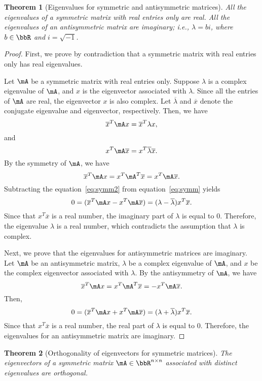 \documentclass[11pt]{article}
\theoremstyle{plain}
\newtheorem{thm}{Theorem}[section]
\theoremstyle{definition}
\begin{document}
\begin{thm}[Eigenvalues for symmetric and antisymmetric matrices]\label{thm:symmeign}
All the eigenvalues of a symmetric matrix with real entries only are real. All the eigenvalues of an antisymmetric matrix are imaginary; i.e., $\lambda = b i$, where $b \in \bbR$ and $ i = \sqrt{-1}$.
\end{thm}
\begin{proof}
	First, we prove by contradiction that a symmetric matrix with real entries only has real eigenvalues. 
	
	Let  $\mA$  be a symmetric  matrix with real entries only. Suppose $\lambda$  is a complex eigenvalue of $\mA$, and $x$ is the eigenvector associated with $\lambda$. Since all the entries of $\mA$ are real, the eigenvector $x$ is also complex. Let $\overline \lambda$ and $\overline x$ denote the conjugate eigenvalue and eigenvector, respectively. Then,  we have
	\begin{equation}\label{eq:symm}
		\overline x^T \mA x = \overline x^T \lambda x,
	\end{equation} 
	and
	\begin{equation}\label{eq:symm2}
		x^T \mA \overline x = x^T \overline \lambda \overline x.
	\end{equation}
	 By the symmetry of $\mA$, we have
	\[ \overline x^T \mA x  = x^T \mA^T \overline x = x^T \mA \overline x .\] 
	 Subtracting the equation~\eqref{eq:symm2} from equation~\eqref{eq:symm} yields	\[  0 = ( \overline x^T \mA x -  x^T \mA \overline x ) = (\lambda - \overline \lambda) x^T \overline x.  \]
	Since that $x^T \overline x$ is a real number, the imaginary part of $\lambda$ is equal to 0. Therefore, the eigenvalue $\lambda$ is a real number, which contradicts the assumption that $\lambda$ is complex.
	
	Next, we prove that the eigenvalues for antisymmetric matrices are imaginary. 
	Let $\mA$ be an antisymmetric matrix,  $\lambda$ be a complex eigenvalue of $\mA$, and $x$ be the complex eigenvector associated with $\lambda$. By the antisymmetry of $\mA$, we have
	\[ \overline x^T \mA x  = x^T \mA^T \overline x  =  -x^T \mA \overline x .  \] 
	Then, 
	\[  0 = ( \overline x^T \mA x +  x^T \mA \overline x ) = (\lambda + \overline \lambda) x^T \overline x.   \]
	Since that $x^T \overline x$ is a real number, the real part of $\lambda$ is equal to 0. Therefore, the eigenvalues for an antisymmetric matrix are imaginary.
\end{proof}

\begin{thm}[Orthogonality of eigenvectors for symmetric matrices]\label{thm:symmortho}
The eigenvectors of a symmetric matrix $\mA \in \bbR^{n \times n}$ associated with distinct eigenvalues are orthogonal.
\end{thm}
\end{document}
